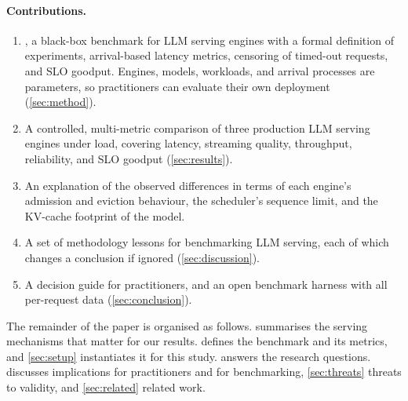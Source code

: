 \paragraph{Contributions.}
\begin{enumerate}
  \item \sysname, a black-box benchmark for LLM serving engines with a formal definition of
  experiments, arrival-based latency metrics, censoring of timed-out requests, and SLO goodput.
  Engines, models, workloads, and arrival processes are parameters, so practitioners can evaluate
  their own deployment (\cref{sec:method}).
  \item A controlled, multi-metric comparison of three production LLM serving engines under
  load, covering latency, streaming quality, throughput, reliability, and SLO goodput
  (\cref{sec:results}).
  \item An explanation of the observed differences in terms of each engine's admission and
  eviction behaviour, the scheduler's sequence limit, and the KV-cache footprint of the model.
  \item A set of methodology lessons for benchmarking LLM serving, each of which changes a
  conclusion if ignored (\cref{sec:discussion}).
  \item A decision guide for practitioners, and an open benchmark harness with all
  per-request data (\cref{sec:conclusion}).
\end{enumerate}

The remainder of the paper is organised as follows.  summarises the
serving mechanisms that matter for our results.  defines the benchmark
and its metrics, and \cref{sec:setup} instantiates it for this study.  answers
the research questions.
 discusses implications for practitioners and for benchmarking,
\cref{sec:threats} threats to validity, and \cref{sec:related} related work.
